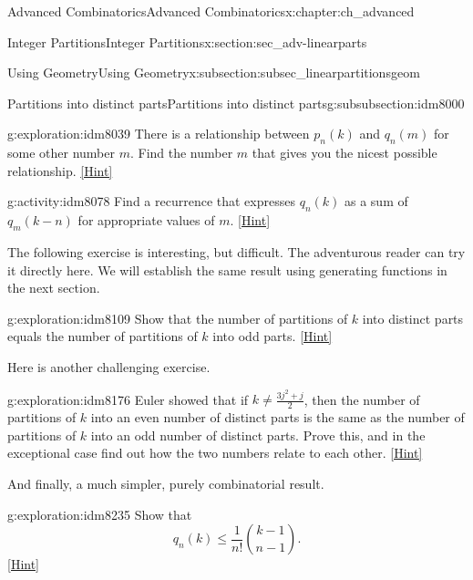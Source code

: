 \documentclass[oneside,10pt,]{book}
\numberwithin{equation}{chapter}
\begin{document}
\begin{chapterptx}{Advanced Combinatorics}{}{Advanced Combinatorics}{}{}{x:chapter:ch_advanced}
\begin{sectionptx}{Integer Partitions}{}{Integer Partitions}{}{}{x:section:sec_adv-linearparts}
\begin{subsectionptx}{Using Geometry}{}{Using Geometry}{}{}{x:subsection:subsec_linearpartitionsgeom}
\begin{subsubsectionptx}{Partitions into distinct parts}{}{Partitions into distinct parts}{}{}{g:subsubsection:idm8000}
\begin{exploration}{}{g:exploration:idm8039}
There is a relationship between \(p_n(k)\) and \(q_n(m)\) for some other number \(m\). Find the number \(m\) that gives you the nicest possible relationship.%
\space\hspace*{0pt}\hfill{\tiny\hyperlink{g:hint:idm8046-back}{[Hint]}}\end{exploration}
\begin{activity}{}{g:activity:idm8078}%
Find a recurrence that expresses \(q_n(k)\) as a sum of \(q_m(k-n)\) for appropriate values of \(m\).%
\space\hspace*{0pt}\hfill{\tiny\hyperlink{g:hint:idm8084-back}{[Hint]}}\end{activity}
The following exercise is interesting, but difficult.  The adventurous reader can try it directly here.  We will establish the same result using generating functions in the next section.%
\begin{exploration}{}{g:exploration:idm8109}%
Show that the number of partitions of \(k\) into distinct parts equals the number of partitions of \(k\) into odd parts.%
\space\hspace*{0pt}\hfill{\tiny\hyperlink{g:hint:idm8114-back}{[Hint]}}\end{exploration}
Here is another challenging exercise.%
\begin{exploration}{}{g:exploration:idm8176}%
Euler showed that if \(k\not= \frac{3j^2+j}{2}\), then the number of partitions of \(k\) into an even number of distinct parts is the same as the number of partitions of \(k\) into an odd number of distinct parts. Prove this, and in the exceptional case find out how the two numbers relate to each other.%
\space\hspace*{0pt}\hfill{\tiny\hyperlink{g:hint:idm8182-back}{[Hint]}}\end{exploration}
And finally, a much simpler, purely combinatorial result.%
\begin{exploration}{}{g:exploration:idm8235}%
Show that%
\begin{equation*}
q_n(k) \le \frac{1}{n!}\binom{k-1}{n-1}.
\end{equation*}
%
\space\hspace*{0pt}\hfill{\tiny\hyperlink{g:hint:idm8239-back}{[Hint]}}\end{exploration}
\end{subsubsectionptx}
\end{subsectionptx}
%
%
\typeout{************************************************}
\typeout{************************************************}

\end{sectionptx}
\end{chapterptx}
\end{document}
